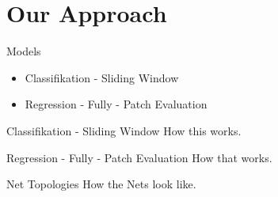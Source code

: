 \section{Our Approach}

\begin{frame}{Models}
	


\centering

\begin{itemize}
 \item Classifikation - Sliding Window \\
 \item Regression - Fully - Patch Evaluation \\
\end{itemize}
\end{frame}

\begin{frame}{Classifikation - Sliding Window}
	\centering
	How this works.
\end{frame}

\begin{frame}{Regression - Fully - Patch Evaluation}
	\centering
	How that works.
\end{frame}

\begin{frame}{Net Topologies}
	\centering
	How the Nets look like.
\end{frame}